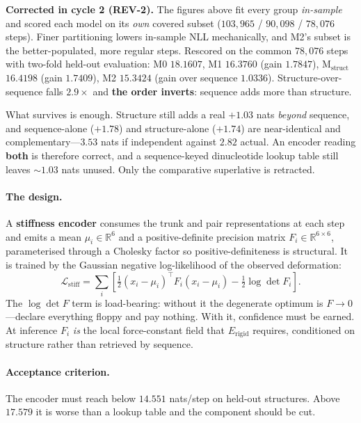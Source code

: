 \documentclass[11pt,a4paper]{article}
\begin{document}
\textcolor{risk}{\textbf{Corrected in cycle 2 (REV-2).}} The figures above fit
every group \emph{in-sample} and scored each model on its \emph{own} covered
subset ($103{,}965$ / $90{,}098$ / $78{,}076$ steps). Finer partitioning lowers
in-sample NLL mechanically, and M2's subset is the better-populated, more
regular steps. Rescored on the common $78{,}076$ steps with two-fold held-out
evaluation: M0 $18.1607$, M1 $16.3760$ (gain $\mathbf{1.7847}$),
M$_{\text{struct}}$ $16.4198$ (gain $1.7409$), M2 $15.3424$
(gain over sequence $\mathbf{1.0336}$). Structure-over-sequence falls
$2.9\times$ and \textbf{the order inverts}: sequence adds more than structure.

What survives is enough. Structure still adds a real $+1.03$ nats \emph{beyond}
sequence, and sequence-alone ($+1.78$) and structure-alone ($+1.74$) are
near-identical and complementary---$3.53$ nats if independent against $2.82$
actual. An encoder reading \textbf{both} is therefore correct, and a
sequence-keyed dinucleotide lookup table still leaves $\sim$$1.03$ nats unused.
Only the comparative superlative is retracted.


\paragraph{The design.} A \textbf{stiffness encoder} consumes the trunk and pair
representations at each step and emits a mean $\mu_i \in \mathbb{R}^6$ and a
positive-definite precision matrix $F_i \in \mathbb{R}^{6\times6}$, parameterised
through a Cholesky factor so positive-definiteness is structural. It is trained
by the Gaussian negative log-likelihood of the observed deformation:
\begin{equation}
\mathcal{L}_{\text{stiff}} = \sum_i \left[ \tfrac{1}{2}(x_i - \mu_i)^{\top} F_i (x_i - \mu_i) - \tfrac{1}{2}\log\det F_i \right].
\end{equation}
The $\log\det F$ term is load-bearing: without it the degenerate optimum is
$F \rightarrow 0$---declare everything floppy and pay nothing. With it,
confidence must be earned. At inference $F_i$ \emph{is} the local force-constant
field that $E_{\text{rigid}}$ requires, conditioned on structure rather than
retrieved by sequence.

\paragraph{Acceptance criterion.} The encoder must reach below $14.551$
nats/step on held-out structures. Above $17.579$ it is worse than a lookup table
and the component should be cut.
\end{document}

